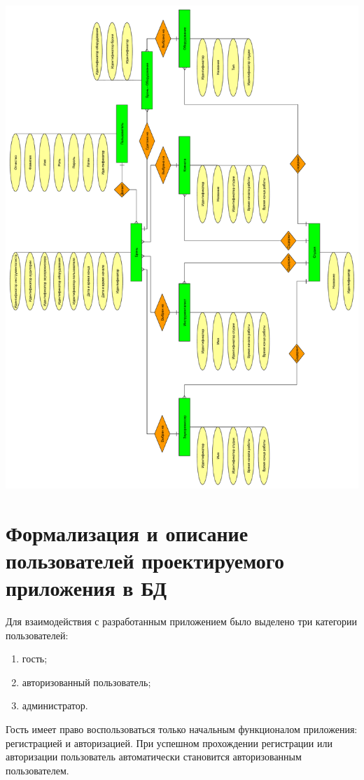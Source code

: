 \begin{center}
	\centering
	\includegraphics[height=0.9\textheight]{inc/img/er_90.pdf}
	\label{img:er}
\end{center}

\section{Формализация и описание пользователей проектируемого приложения в БД}
Для взаимодействия с разработанным приложением было выделено три категории пользователей:
\begin{enumerate}
	\item гость;
	\item авторизованный пользователь;
	\item администратор.
\end{enumerate}

Гость имеет право воспользоваться только начальным функционалом приложения: регистрацией и авторизацией.
При успешном прохождении регистрации или авторизации пользователь автоматически становится авторизованным пользователем.

